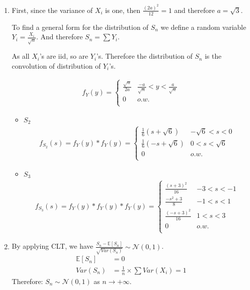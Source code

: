 \documentclass[12pt, letterpaper]{scrartcl}
\begin{document}
\begin{enumerate}[((a))]
    \item
    First, since the variance of $X_i$ is one, then $\frac{(2a)^2}{12}=1$ and therefore $a=\sqrt{3}$.
    
    To find a general form for the distribution of $S_n$ we define a random variable $Y_i=\frac{X_i}{\sqrt{n}}$. And therefore $S_n=\sum Y_i$.
    
    As all $X_i$'s are iid, so are $Y_i$'s. Therefore the distribution of $S_n$ is the convolution of distribution of $Y_i$'s.
    
    \begin{align*}
        f_Y(y)=
        \begin{cases} 
            \frac{\sqrt{n}}{2a}  & \frac{-a}{\sqrt{n}} < y < \frac{a}{\sqrt{n}}\\
            0 & o.w.\\
        \end{cases}
    \end{align*}
    
    \begin{itemize}
        \item $S_2$
        \begin{align*}
            f_{S_2}(s)=f_Y(y)*f_Y(y)=
        \begin{cases} 
            \frac{1}{6}(s+\sqrt{6})   &{-\sqrt{6} < s < 0}\\
            \frac{1}{6}(-s+\sqrt{6})   &{0 < s < \sqrt{6}}\\
            0 & o.w.\\
        \end{cases}
        \end{align*}
        
        \item $S_3$
        \begin{align*}
            f_{S_3}(s)=f_Y(y)*f_Y(y)*f_Y(y)=
            \begin{cases} 
            \frac{(s+3)^2}{16}   &{-3 < s < -1}\\
            \frac{-s^2+3}{8}   &{-1 < s < 1}\\
            \frac{(-s+3)^2}{16}   &{1 < s < 3}\\
            0 & o.w.\\
        \end{cases}
        \end{align*}
    \end{itemize}
    \item
    By applying CLT, we have $\frac{S_n-\mathbb{E}[S_n]}{\sqrt{Var(S_n)}}\sim \mathcal{N}(0,1)$.
    \begin{align*}
        \mathbb{E}[S_n]&=0\\
        Var(S_n)&=\frac{1}{n}\times\sum Var(X_i)=1
    \end{align*}
    Therefore: $S_n\sim \mathcal{N}(0,1)$ as $n\rightarrow+\infty$.
    

\end{enumerate}
\end{document}
